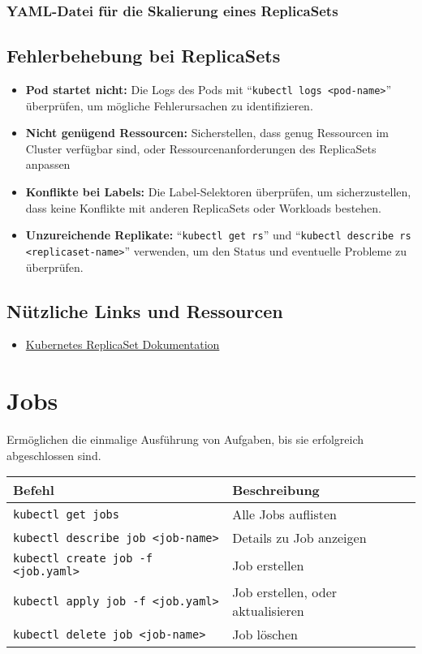 \subsubsection{YAML-Datei für die Skalierung eines ReplicaSets}


\subsection{Fehlerbehebung bei ReplicaSets}
\begin{itemize}
    \item \textbf{Pod startet nicht:} Die Logs des Pods mit \enquote{\texttt{kubectl logs <pod-name>}} überprüfen, um mögliche Fehlerursachen zu identifizieren.
    \item \textbf{Nicht genügend Ressourcen:} Sicherstellen, dass genug Ressourcen im Cluster verfügbar sind, oder Ressourcenanforderungen des ReplicaSets anpassen
    \item \textbf{Konflikte bei Labels:} Die Label-Selektoren überprüfen, um sicherzustellen, dass keine Konflikte mit anderen ReplicaSets oder Workloads bestehen.
    \item \textbf{Unzureichende Replikate:} \enquote{\texttt{kubectl get rs}} und \enquote{\texttt{kubectl describe rs <replicaset-name>}} verwenden, um den Status und eventuelle Probleme zu überprüfen.
\end{itemize}

\subsection{Nützliche Links und Ressourcen}
\begin{itemize}
    \item \href{https://kubernetes.io/docs/concepts/workloads/controllers/replicaset/}{Kubernetes ReplicaSet Dokumentation}
\end{itemize}


\section{Jobs}
Ermöglichen die einmalige Ausführung von Aufgaben, bis sie erfolgreich abgeschlossen sind. \\

\noindent
\begin{tabular}{
|l|l|}
\hline
\textbf{Befehl} & \textbf{Beschreibung} \\
\hline
\texttt{kubectl get jobs} & Alle Jobs auflisten \\
\texttt{kubectl describe job <job-name>} & Details zu Job anzeigen \\
\texttt{kubectl create job -f <job.yaml>} & Job erstellen\\
\texttt{kubectl apply job -f <job.yaml>} & Job erstellen, oder aktualisieren\\
\texttt{kubectl delete job <job-name>} & Job löschen \\
\hline
\end{tabular}


